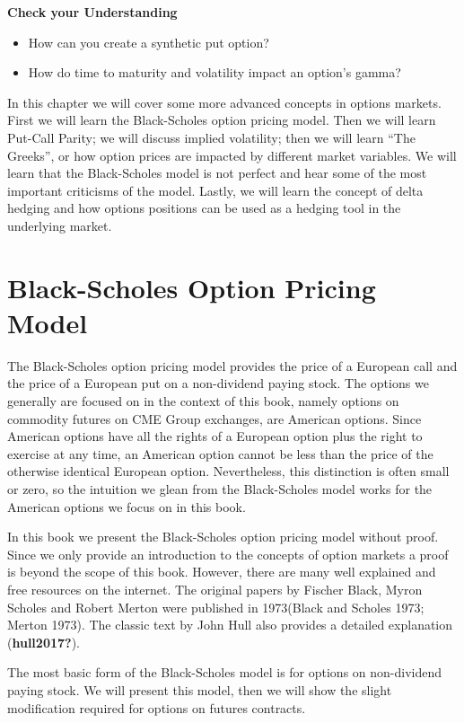 \documentclass[
  letterpaper,
  DIV=11,
  numbers=noendperiod]{scrreprt}
\begin{document}
\textbf{Check your Understanding}

\begin{itemize}
\item
  How can you create a synthetic put option?
\item
  How do time to maturity and volatility impact an option's gamma?
\end{itemize}

In this chapter we will cover some more advanced concepts in options
markets. First we will learn the Black-Scholes option pricing model.
Then we will learn Put-Call Parity; we will discuss implied volatility;
then we will learn ``The Greeks'', or how option prices are impacted by
different market variables. We will learn that the Black-Scholes model
is not perfect and hear some of the most important criticisms of the
model. Lastly, we will learn the concept of delta hedging and how
options positions can be used as a hedging tool in the underlying
market.

\section{Black-Scholes Option Pricing
Model}\label{black-scholes-option-pricing-model}

The Black-Scholes option pricing model provides the price of a European
call and the price of a European put on a non-dividend paying stock. The
options we generally are focused on in the context of this book, namely
options on commodity futures on CME Group exchanges, are American
options. Since American options have all the rights of a European option
plus the right to exercise at any time, an American option cannot be
less than the price of the otherwise identical European option.
Nevertheless, this distinction is often small or zero, so the intuition
we glean from the Black-Scholes model works for the American options we
focus on in this book.

In this book we present the Black-Scholes option pricing model without
proof. Since we only provide an introduction to the concepts of option
markets a proof is beyond the scope of this book. However, there are
many well explained and free resources on the internet. The original
papers by Fischer Black, Myron Scholes and Robert Merton were published
in 1973(Black and Scholes 1973; Merton 1973). The classic text by John
Hull also provides a detailed explanation (\textbf{hull2017?}).

The most basic form of the Black-Scholes model is for options on
non-dividend paying stock. We will present this model, then we will show
the slight modification required for options on futures contracts.
\end{document}
